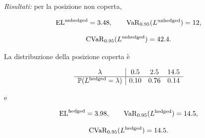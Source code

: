 \begin{exercise}
\textit{Risultati:} per la posizione non coperta,

\[
\mathrm{EL}^{\mathrm{unhedged}}=3.48,
\qquad
\operatorname{VaR}_{0.95}(L^{\mathrm{unhedged}})=12,
\]

\[
\operatorname{CVaR}_{0.95}(L^{\mathrm{unhedged}})=42.4.
\]

La distribuzione della posizione coperta \`{e}

\[
\begin{array}{c|ccc}
\lambda
&
0.5
&
2.5
&
14.5
\\
\hline
\mathbb{P}(L^{\mathrm{hedged}}=\lambda)
&
0.10
&
0.76
&
0.14
\end{array}
\]

e

\[
\mathrm{EL}^{\mathrm{hedged}}=3.98,
\qquad
\operatorname{VaR}_{0.95}(L^{\mathrm{hedged}})=14.5,
\]

\[
\operatorname{CVaR}_{0.95}(L^{\mathrm{hedged}})=14.5.
\]

\end{exercise}

